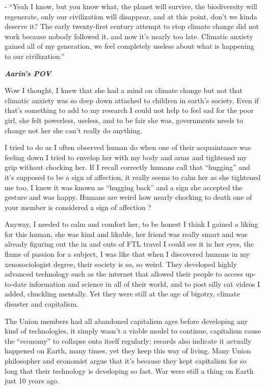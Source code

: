 \documentclass[colorlinks,12pt,a4paper]{book}
\begin{document}
- “Yeah I know, but you know what, the planet will survive, the biodiversity will regenerate, only our civilization 
will disappear, and at this point, don't we kinda deserve it? The early twenty-first century attempt to stop climate 
change did not work because nobody followed it, and now it's nearly too late. Climatic anxiety gained all of my generation,
we feel completely useless about what is happening to our civilization.”\par
\bigskip

\textit{\textbf{Aarin's POV}}\par
\bigskip

Wow I thought, I knew that she had a mind on climate change but not that climatic anxiety was so deep down attached 
to children in earth's society. Even if that's something to add to my research I could not help to feel sad for the
 poor girl, she felt powerless, useless, and to be fair she was, governments needs to change not her she can't really 
 do anything. \par
 \bigskip

I tried to do as I often observed human do when one of their acquaintance was feeling down I tried to envelop her 
with my body and arms and tightened my grip without chocking her. If I recall correctly humans call that “hugging”
 and it's supposed to be a sign of affection, it really seems to calm her as she tightened me too, I knew it was known 
 as “hugging back” and a sign she accepted the gesture and was happy. Humans are weird how nearly chocking 
 to death one of your member is considered a sign of affection ?\par
 \bigskip

Anyway, I needed to calm and comfort her, to be honest I think I gained a liking for this human, she was kind and likable, 
her friend was really smart and was already figuring out the in and outs of FTL travel I could see it in her eyes,
 the flame of passion for a subject, I was like that when I discovered humans in my xenosociologist degree, their 
 society is so, so weird. They developed highly advanced technology such as the internet that allowed their people 
 to access up-to-date information and science in all of their world, and to post silly cat videos I added, chuckling 
 mentally. Yet they were still at the age of bigotry, climate disaster and capitalism.\par
 \bigskip

The Union members had all abandoned capitalism ages before developing any kind of technologies, 
it simply wasn't a viable model to continue, capitalism cause the “economy” to collapse onto itself regularly;
 records also indicate it actually happened on Earth, many times, yet they keep this way of living. 
 Many Union philosopher and economist argue that it's because they kept capitalism for so long that their 
 technology is developing so fast. War were still a thing on Earth just 10 years ago.\par
 \bigskip
\end{document}
